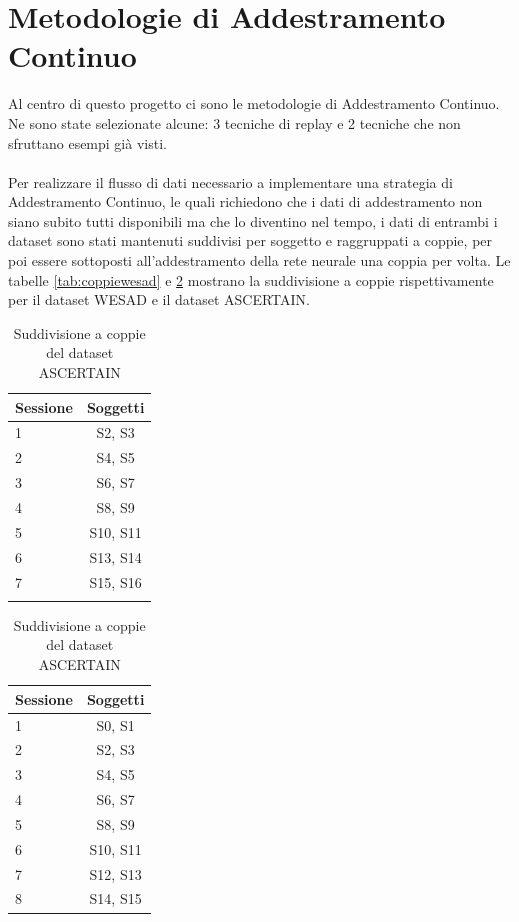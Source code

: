 \section{Metodologie di Addestramento Continuo}
Al centro di questo progetto ci sono le metodologie di Addestramento Continuo. Ne sono state selezionate alcune: 3 tecniche di replay e 2 tecniche che non sfruttano esempi già visti.\\\\
Per realizzare il flusso di dati necessario a implementare una strategia di Addestramento Continuo, le quali richiedono che i dati di addestramento non siano subito tutti disponibili ma che lo diventino nel tempo, i dati di entrambi i dataset sono stati mantenuti suddivisi per soggetto e raggruppati a coppie, per poi essere sottoposti all'addestramento della rete neurale una coppia per volta. Le tabelle \ref{tab:coppiewesad} e \ref{tab:coppieascertain} mostrano la suddivisione a coppie rispettivamente per il dataset WESAD e il dataset ASCERTAIN.
\begin{table}[h]
    \parbox{.45\linewidth}{
    	\begin{center}
    		\begin{tabular}{l|c}
    		     \textbf{Sessione} & \textbf{Soggetti}\\
    		     \hline
    		     1 & S2, S3 \\
    		     2 & S4, S5 \\
    		     3 & S6, S7 \\
    		     4 & S8, S9 \\
    		     5 & S10, S11 \\
    		     6 & S13, S14 \\
    		     7 & S15, S16 \\
    		     \multicolumn{1}{c}{}
    		\end{tabular}
    		\caption{Suddivisione a coppie del dataset WESAD}
    		\label{tab:coppiewesad}
    	\end{center}
	}
    \parbox{.45\linewidth}{
    	\begin{center}
    		\begin{tabular}{l|c}
    		     \textbf{Sessione} & \textbf{Soggetti}\\
    		     \hline
    		     1 & S0, S1 \\
    		     2 & S2, S3 \\
    		     3 & S4, S5 \\
    		     4 & S6, S7 \\
    		     5 & S8, S9 \\
    		     6 & S10, S11 \\
    		     7 & S12, S13 \\
    		     8 & S14, S15 \\
    		\end{tabular}
    		\caption{Suddivisione a coppie del dataset ASCERTAIN}
    		\label{tab:coppieascertain}
    	\end{center}
    }
\end{table}\\
